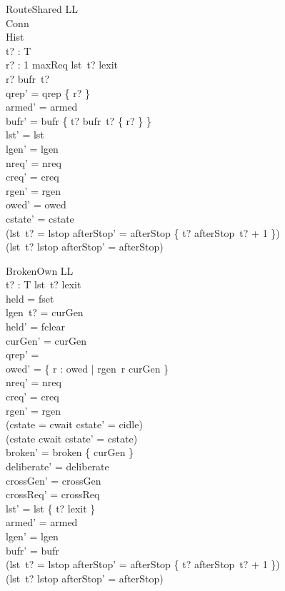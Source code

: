 \documentclass[a4paper,10pt,fleqn]{article}
\begin{document}
\begin{schema}{RouteShared}
  \Delta LL \\
  \Xi Conn \\
  \Xi Hist \\
  t? : T \\
  r? : 1 \upto maxReq
\where
  lst~t? \neq lexit \\
  r? \in bufr~t? \\
  qrep' = qrep \cup \{ r? \} \\
  armed' = armed \\
  bufr' = bufr \oplus \{ t? \mapsto bufr~t? \setminus \{ r? \} \} \\
  lst' = lst \\
  lgen' = lgen \\
  nreq' = nreq \\
  creq' = creq \\
  rgen' = rgen \\
  owed' = owed \\
  cstate' = cstate \\
  (lst~t? = lstop \implies
    afterStop' = afterStop \oplus \{ t? \mapsto afterStop~t? + 1 \}) \\
  (lst~t? \neq lstop \implies afterStop' = afterStop)
\end{schema}

\begin{schema}{BrokenOwn}
  \Delta LL \\
  t? : T
\where
  lst~t? \neq lexit \\
  held = fset \\
  lgen~t? = curGen \\
  held' = fclear \\
  curGen' = curGen \\
  qrep' = \emptyset \\
  owed' = \{ r : owed | rgen~r \neq curGen \} \\
  nreq' = nreq \\
  creq' = creq \\
  rgen' = rgen \\
  (cstate = cwait \implies cstate' = cidle) \\
  (cstate \neq cwait \implies cstate' = cstate) \\
  broken' = broken \cup \{ curGen \} \\
  deliberate' = deliberate \\
  crossGen' = crossGen \\
  crossReq' = crossReq \\
  lst' = lst \oplus \{ t? \mapsto lexit \} \\
  armed' = armed \\
  lgen' = lgen \\
  bufr' = bufr \\
  (lst~t? = lstop \implies
    afterStop' = afterStop \oplus \{ t? \mapsto afterStop~t? + 1 \}) \\
  (lst~t? \neq lstop \implies afterStop' = afterStop)
\end{schema}
\end{document}
